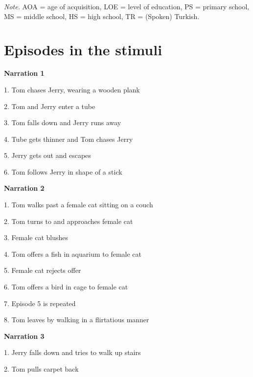 \documentclass[]{elsarticle} %
\begin{document}
\begin{table}[hbt!]
\begin{center}
\begin{threeparttable}
{}

\begin{tablenotes}[para]
\normalsize{\textit{Note.} AOA = age of acquisition, LOE = level of education, PS = primary school, MS = middle school, HS = high school, TR = (Spoken) Turkish.}
\end{tablenotes}

\end{threeparttable}
\end{center}

\end{table}

\clearpage

\setlength{\columnsep}{10pt}
\twocolumn
\linespread{1}
\justifying
\footnotesize

\hypertarget{episodes-in-the-stimuli}{%
\section{Episodes in the stimuli}\label{episodes-in-the-stimuli}}

\label{section:b}

\textbf{Narration 1}

1. Tom chases Jerry, wearing a wooden plank

2. Tom and Jerry enter a tube

3. Tom falls down and Jerry runs away

4. Tube gets thinner and Tom chases Jerry

5. Jerry gets out and escapes

6. Tom follows Jerry in shape of a stick

\textbf{Narration 2}

1. Tom walks past a female cat sitting on a couch

2. Tom turns to and approaches female cat

3. Female cat blushes

4. Tom offers a fish in aquarium to female cat

5. Female cat rejects offer

6. Tom offers a bird in cage to female cat

7. Episode 5 is repeated

8. Tom leaves by walking in a flirtatious manner

\textbf{Narration 3}

1. Jerry falls down and tries to walk up stairs

2. Tom pulls carpet back
\end{document}
